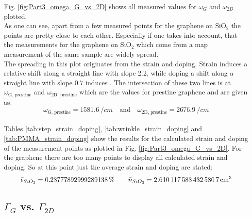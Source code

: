 \documentclass[12pt,a4paper]{article}
\begin{document}
Fig. \ref{fig:Part3_omega_G_vs_2D} shows all measured values for $\omega _G$ and $\omega _{2D}$ plotted. \\
As one can see, apart from a few measured points for the graphene on SiO$_2$ the points are pretty close to each other. Especially if one takes into account, that the measurements for the graphene on SiO$_2$ which come from a map measurement of the same sample are widely spread. \\
The spreading in this plot originates from the strain and doping. Strain induces a relative shift along a straight line with slope 2.2, while doping a shift along a straight line with slope 0.7 induces \cite{NeumannStampfer}. The intersection of these two lines is at $\omega _{\text{G, prestine}}$ and $\omega _{\text{2D, prestine}}$ which are the values for prestine graphene and are given as: 
\begin{equation*}
\omega _{\text{G, prestine}} = \SI{1581.6}{\per cm} \quad \text{and} \quad \omega _{\text{2D, prestine}} = \SI{2676.9}{\per cm}
\end{equation*} \\

Tables \ref{tab:step_strain_doping}, \ref{tab:wrinkle_strain_doping} and \ref{tab:PMMA_strain_doping} show the results for the calculated strain and doping of the measurement points as plotted in Fig. \ref{fig:Part3_omega_G_vs_2D}.  For the graphene there are too many points to display all calculated strain and doping. So at this point just the average strain and doping are stated:
\begin{equation*}
\bar{\epsilon} _{SiO_2} = 0.23777892999289138 \, \% \qquad \bar{n} _{SiO_2} = \SI{2.6101175834325807}{\per c \cubic m}
\end{equation*}


\subsection{$\Gamma _G$ vs. $\Gamma _{2D}$}
\end{document}
